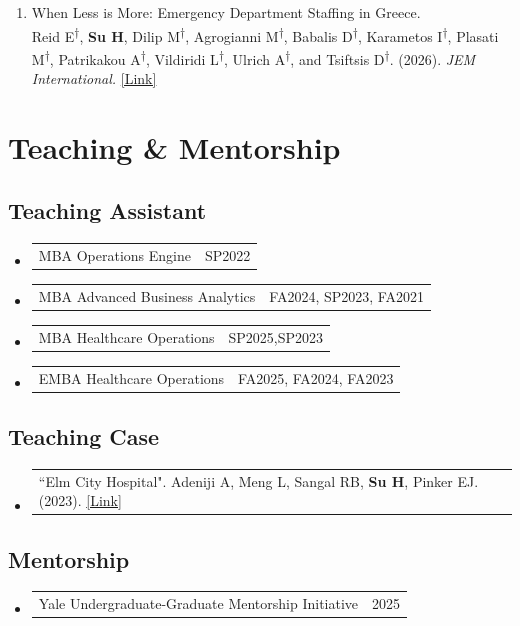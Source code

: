 \documentclass[letterpaper,11pt]{article}
\makeatletter
\newcommand{\resumeProjectHeading}[2]{
    \item
    \begin{tabular*}{0.97\textwidth}{l@{\extracolsep{\fill}}r}
      \small#1 & #2 \\
    \end{tabular*}\vspace{-7pt}
}
\newcommand{\resumeSubHeadingListStart}{\begin{itemize}[leftmargin=0.15in, label={}]}
\newcommand{\resumeSubHeadingListEnd}{\end{itemize}}
\makeatother
\begin{document}
\begin{enumerate}
    \item When Less is More: Emergency Department Staffing in Greece.\\ Reid E\textsuperscript{†}, \textbf{Su H}, Dilip M\textsuperscript{†}, Agrogianni M\textsuperscript{†}, Babalis D\textsuperscript{†}, Karametos I\textsuperscript{†}, Plasati M\textsuperscript{†}, Patrikakou A\textsuperscript{†}, Vildiridi L\textsuperscript{†}, Ulrich A\textsuperscript{†}, and Tsiftsis D\textsuperscript{†}. (2026). \textit{JEM International.} \href{https://www.sciencedirect.com/science/article/pii/S3051322726000037}{\textcolor{linkblue}{[Link]}}
    


    



 
\end{enumerate}

\section{Teaching \& Mentorship}
\subsection*{Teaching Assistant}
\resumeSubHeadingListStart
        \resumeProjectHeading
        {MBA Operations Engine}{SP2022}
        \resumeProjectHeading
        {MBA Advanced Business Analytics}{FA2024, SP2023, FA2021}
        \resumeProjectHeading
        {MBA Healthcare Operations}{SP2025,SP2023}
        \resumeProjectHeading
        {EMBA Healthcare Operations}{FA2025, FA2024, FA2023}
\resumeSubHeadingListEnd

\subsection*{Teaching Case}
\resumeSubHeadingListStart
\resumeProjectHeading{{``Elm City Hospital".}
    Adeniji A, Meng L, Sangal RB, \textbf{Su H}, Pinker EJ. (2023). \href{https://cases.som.yale.edu/elm-city-hospital/access}{\textcolor{linkblue}{[Link]}}}{}
\resumeSubHeadingListEnd

\subsection*{Mentorship}
\resumeSubHeadingListStart
\resumeProjectHeading{Yale Undergraduate-Graduate Mentorship Initiative}{2025}
\resumeSubHeadingListEnd
\end{document}
